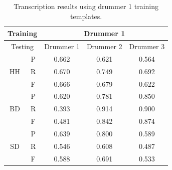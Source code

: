 \documentclass{article}
\begin{document}
\begin{table}[h]
\begin{center}
\begin{tabular}{|c|c|c|c|c|}
\hline
\multicolumn{2}{|c}{Training} & \multicolumn{3}{|c|}{Drummer 1}   \\ \hline
\multicolumn{2}{|c|}{Testing} & Drummer 1 & Drummer 2 & Drummer 3 \\ \hline
\multirow{3}{*}{HH}    & P    & 0.662     & 0.621     & 0.564     \\ \cline{2-5} 
                       & R    & 0.670     & 0.749     & 0.692     \\ \cline{2-5} 
                       & F    & 0.666     & 0.679     & 0.622     \\ \hline
\multirow{3}{*}{BD}    & P    & 0.620     & 0.781     & 0.850      \\ \cline{2-5} 
                       & R    & 0.393     & 0.914     & 0.900      \\ \cline{2-5} 
                       & F    & 0.481     & 0.842     & 0.874     \\ \hline
\multirow{3}{*}{SD}    & P    & 0.639     & 0.800     & 0.589     \\ \cline{2-5} 
                       & R    & 0.546     & 0.608     & 0.487     \\ \cline{2-5} 
                       & F    & 0.588     & 0.691     & 0.533     \\ \hline
\end{tabular}
 \caption{Transcription results using drummer 1 training templates.}
 \label{tab:trainDr1}
\end{center}
\end{table}
\end{document}
